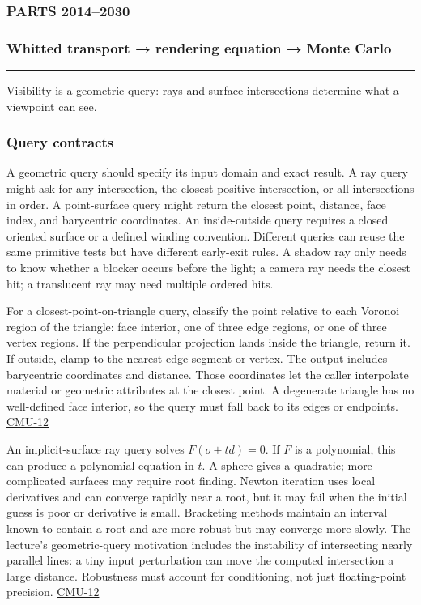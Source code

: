 \subsubsection{PARTS 2014--2030}\label{parts-20142030}

\subsubsection{Whitted transport → rendering equation → Monte Carlo}\label{whitted-transport-rendering-equation-monte-carlo}

\begin{center}\rule{0.5\linewidth}{0.5pt}\end{center}

Visibility is a geometric query: rays and surface intersections determine what a viewpoint can see.

\subsubsection{Query contracts}\label{query-contracts}

A geometric query should specify its input domain and exact result. A ray query might ask for any intersection, the closest positive intersection, or all intersections in order. A point-surface query might return the closest point, distance, face index, and barycentric coordinates. An inside-outside query requires a closed oriented surface or a defined winding convention. Different queries can reuse the same primitive tests but have different early-exit rules. A shadow ray only needs to know whether a blocker occurs before the light; a camera ray needs the closest hit; a translucent ray may need multiple ordered hits.

For a closest-point-on-triangle query, classify the point relative to each Voronoi region of the triangle: face interior, one of three edge regions, or one of three vertex regions. If the perpendicular projection lands inside the triangle, return it. If outside, clamp to the nearest edge segment or vertex. The output includes barycentric coordinates and distance. Those coordinates let the caller interpolate material or geometric attributes at the closest point. A degenerate triangle has no well-defined face interior, so the query must fall back to its edges or endpoints. \hyperref[04-visual-computing-ii-ch036]{CMU-12}

An implicit-surface ray query solves \(F(o+td)=0\). If \(F\) is a polynomial, this can produce a polynomial equation in \(t\). A sphere gives a quadratic; more complicated surfaces may require root finding. Newton iteration uses local derivatives and can converge rapidly near a root, but it may fail when the initial guess is poor or derivative is small. Bracketing methods maintain an interval known to contain a root and are more robust but may converge more slowly. The lecture's geometric-query motivation includes the instability of intersecting nearly parallel lines: a tiny input perturbation can move the computed intersection a large distance. Robustness must account for conditioning, not just floating-point precision. \hyperref[04-visual-computing-ii-ch036]{CMU-12}

